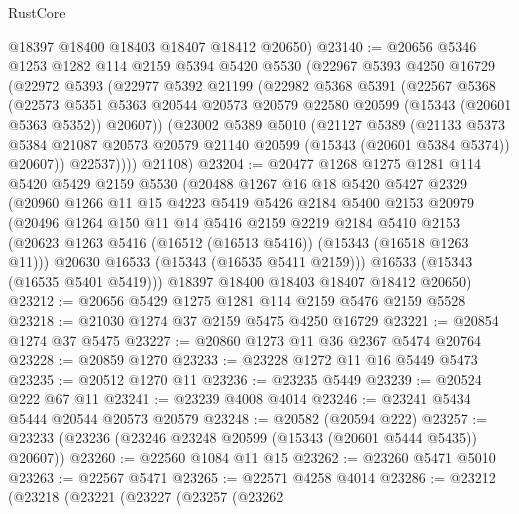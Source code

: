 \begin{lexlean}{RustCore}
\begin{coremodule}
      @18397
      @18400
      @18403
      @18407
      @18412
      @20650)
@23140 := @20656
    @5346
    @1253
    @1282
    @114
    @2159
    @5394
    @5420
    @5530
    (@22967
      @5393
      @4250
      @16729
      (@22972
        @5393
        (@22977
          @5392
          @21199
          (@22982
            @5368
            @5391
            (@22567
              @5368
              (@22573
                @5351
                @5363
                @20544
                @20573
                @20579
                @22580
                @20599
                (@15343 (@20601 @5363 @5352))
                @20607))
            (@23002
              @5389
              @5010
              (@21127
                @5389
                (@21133
                  @5373
                  @5384
                  @21087
                  @20573
                  @20579
                  @21140
                  @20599
                  (@15343 (@20601 @5384 @5374))
                  @20607))
              @22537))))
      @21108)
@23204 := @20477
    @1268
    @1275
    @1281
    @114
    @5420
    @5429
    @2159
    @5530
    (@20488
      @1267
      @16
      @18
      @5420
      @5427
      @2329
      (@20960
        @1266
        @11
        @15
        @4223
        @5419
        @5426
        @2184
        @5400
        @2153
        @20979
        (@20496
          @1264
          @150
          @11
          @14
          @5416
          @2159
          @2219
          @2184
          @5410
          @2153
          (@20623 @1263 @5416 (@16512 (@16513 @5416)) (@15343 (@16518 @1263 @11)))
          @20630
          @16533
          (@15343 (@16535 @5411 @2159)))
        @16533
        (@15343 (@16535 @5401 @5419)))
      @18397
      @18400
      @18403
      @18407
      @18412
      @20650)
@23212 := @20656 @5429 @1275 @1281 @114 @2159 @5476 @2159 @5528
@23218 := @21030 @1274 @37 @2159 @5475 @4250 @16729
@23221 := @20854 @1274 @37 @5475
@23227 := @20860 @1273 @11 @36 @2367 @5474 @20764
@23228 := @20859 @1270
@23233 := @23228 @1272 @11 @16 @5449 @5473
@23235 := @20512 @1270 @11
@23236 := @23235 @5449
@23239 := @20524 @222 @67 @11
@23241 := @23239 @4008 @4014
@23246 := @23241 @5434 @5444 @20544 @20573 @20579
@23248 := @20582 (@20594 @222)
@23257 := @23233 (@23236 (@23246 @23248 @20599 (@15343 (@20601 @5444 @5435)) @20607))
@23260 := @22560 @1084 @11 @15
@23262 := @23260 @5471 @5010
@23263 := @22567 @5471
@23265 := @22571 @4258 @4014
@23286 := @23212
    (@23218
      (@23221
        (@23227
          (@23257
            (@23262

\end{coremodule}
\end{lexlean}
